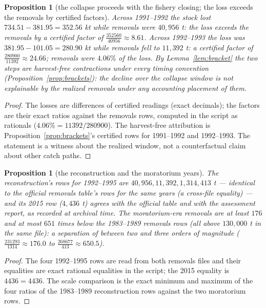 \documentclass[10pt,twocolumn]{article}
\theoremstyle{plain}
\newtheorem{proposition}[theorem]{Proposition}
\theoremstyle{remark}
\begin{document}
\begin{proposition}[the collapse proceeds with the fishery closing;
the loss exceeds the removals by certified factors]
\label{prop:moratorium}
Across 1991--1992 the stock lost \(734.51 - 381.95 = 352.56\) kt while
removals were \(40{,}956\) t: the loss exceeds the removals by a
certified factor of \(\tfrac{352560}{40956} \approx 8.61\). Across
1992--1993 the loss was \(381.95 - 101.05 = 280.90\) kt while removals
fell to \(11{,}392\) t: a certified factor of
\(\tfrac{280900}{11392} \approx 24.66\); removals were \(4.06\%\) of
the loss. By Lemma~\ref{lem:bracket} the two steps are harvest-free
contractions under every timing convention
(Proposition~\ref{prop:brackets}): the decline over the collapse window
is not explainable by the realized removals under any accounting
placement of them.
\end{proposition}

\begin{proof}
The losses are differences of certified readings (exact decimals);
the factors are their exact ratios against the removals rows, computed
in the script as rationals (\(4.06\% = 11392/280900\)). The
harvest-free attribution is Proposition~\ref{prop:brackets}'s
certified rows for 1991--1992 and 1992--1993. The statement is a
witness about the realized window, not a counterfactual claim about
other catch paths.
\end{proof}

\begin{proposition}[the reconstruction and the moratorium years]
\label{prop:catchrecord}
The reconstruction's rows for 1992--1995 are
\(40{,}956, 11{,}392, 1{,}314, 413\) t --- identical to the official
removals table's rows for the same years (a cross-file equality) --- and
its 2015 row (\(4{,}436\) t) agrees with the official table and with
the assessment report, as recorded at archival time. The
moratorium-era removals are at least \(176\) and at most \(651\)
times below the 1983--1989 removals rows (all above \(130{,}000\) t in
the same file): a separation of between two and three orders of
magnitude (\(\tfrac{231293}{1314} \approx 176.0\) to
\(\tfrac{268677}{413} \approx 650.5\)).
\end{proposition}

\begin{proof}
The four 1992--1995 rows are read from both removals files and their
equalities are exact rational equalities in the script; the 2015
equality is \(4436 = 4436\). The scale comparison is the exact minimum
and maximum of the four ratios of the 1983--1989 reconstruction rows
against the two moratorium rows.
\end{proof}
\end{document}
